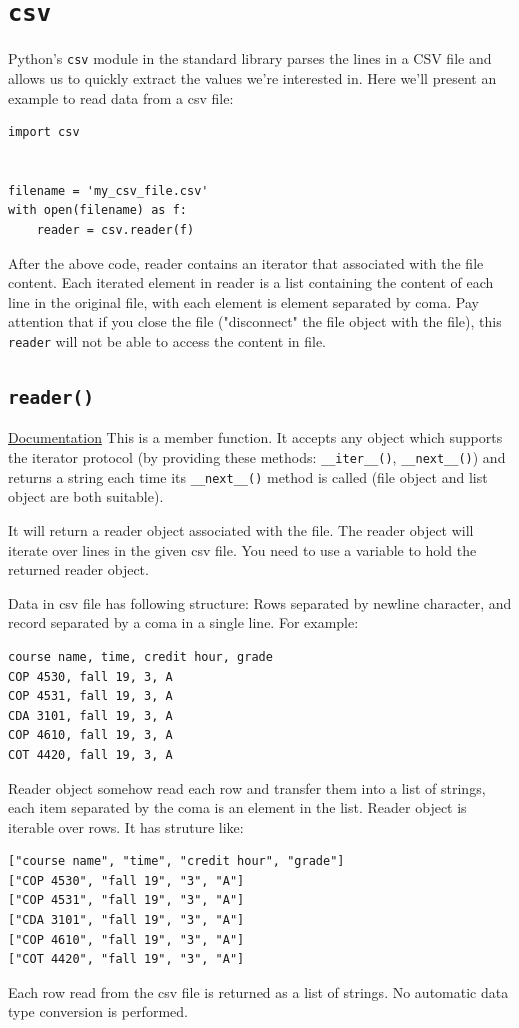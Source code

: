 \documentclass[12pt]{book}
\begin{document}
\chapter{\texttt{csv}}
\label{sec:orgd672030}
Python's \texttt{csv} module in the standard library parses the lines in a CSV file and allows us to quickly extract the values we're interested in. Here we'll present an example to read data from a csv file:
\begin{verbatim}
import csv


filename = 'my_csv_file.csv'
with open(filename) as f:
    reader = csv.reader(f)
\end{verbatim}
After the above code, reader contains an iterator that associated with the file content. Each iterated element in reader is a list containing the content of each line in the original file, with each element is element separated by coma. Pay attention that if you close the file ("disconnect" the file object with the file), this \texttt{reader} will not be able to access the content in file.

\section{\texttt{reader()}}
\label{sec:org1eef50a}
\href{https://docs.python.org/3/library/csv.html\#csv.reader}{Documentation}
This is a member function. It accepts any object which supports the iterator protocol (by providing these methods: \texttt{\_\_iter\_\_()}, \texttt{\_\_next\_\_()}) and returns a string each time its \texttt{\_\_next\_\_()} method is called (file object and list object are both suitable).

It will return a reader object associated with the file. The reader object will iterate over lines in the given csv file. You need to use a variable to hold the returned reader object.

Data in csv file has following structure: Rows separated by newline character, and record separated by a coma in a single line. For example:
\begin{verbatim}
course name, time, credit hour, grade
COP 4530, fall 19, 3, A
COP 4531, fall 19, 3, A
CDA 3101, fall 19, 3, A
COP 4610, fall 19, 3, A
COT 4420, fall 19, 3, A
\end{verbatim}

Reader object somehow read each row and transfer them into a list of strings, each item separated by the coma is an element in the list. Reader object is iterable over rows. It has struture like:
\begin{verbatim}
["course name", "time", "credit hour", "grade"]
["COP 4530", "fall 19", "3", "A"]
["COP 4531", "fall 19", "3", "A"]
["CDA 3101", "fall 19", "3", "A"]
["COP 4610", "fall 19", "3", "A"]
["COT 4420", "fall 19", "3", "A"]
\end{verbatim}
Each row read from the csv file is returned as a list of strings. No automatic data type conversion is performed.
\end{document}
